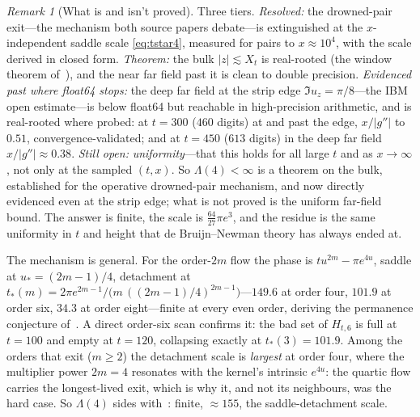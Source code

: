 \documentclass[11pt,reqno]{amsart}
\theoremstyle{plain}
\theoremstyle{definition}
\theoremstyle{remark}
\newtheorem{remark}[theorem]{Remark}
\begin{document}
\begin{remark}[What is and isn't proved]\label{rem:gpu-proof}
Three tiers. \emph{Resolved:} the drowned-pair exit---the mechanism both
source papers debate---is extinguished at the $x$-independent saddle scale
\eqref{eq:tstar4}, measured for pairs to $x\approx10^4$, with the scale
derived in closed form. \emph{Theorem:} the bulk $|z|\lesssim X_t$ is
real-rooted (the window theorem of~\cite{FontesIBM}), and the near far
field past it is clean to double precision. \emph{Evidenced past where float64 stops:} the deep far field at the strip
edge $\Im u_z=\pi/8$---the IBM open estimate---is below float64 but
reachable in high-precision arithmetic, and is real-rooted where probed: at
$t=300$ ($460$ digits) at and past the edge, $x/|g''|$ to $0.51$,
convergence-validated; and at $t=450$ ($613$ digits) in the deep far field
$x/|g''|\approx0.38$. \emph{Still open:} \emph{uniformity}---that this holds
for all large $t$ and as $x\to\infty$, not only at the sampled $(t,x)$. So $\Lambda(4)<\infty$ is a
theorem on the bulk, established for the operative drowned-pair mechanism,
and now directly evidenced even at the strip edge; what is not proved is
the uniform far-field bound. The answer is finite, the scale is
$\tfrac{64}{27}\pi e^3$, and the residue is the same uniformity in
$t$ and height that de Bruijn--Newman theory has always ended at.
\end{remark}

The mechanism is general. For the order-$2m$ flow the phase is
$tu^{2m}-\pi e^{4u}$, saddle at $u_*=(2m-1)/4$, detachment at
$t_*(m)=2\pi e^{2m-1}/\bigl(m\,((2m-1)/4)^{2m-1}\bigr)$---$149.6$ at order
four, $101.9$ at order six, $34.3$ at order eight---finite at every even
order, deriving the permanence conjecture of~\cite{FontesIBM}. A direct
order-six scan confirms it: the bad set of $H_{t,6}$ is full at $t=100$ and
empty at $t=120$, collapsing exactly at $t_*(3)=101.9$. Among the orders
that exit ($m\ge2$) the detachment scale is \emph{largest} at order four,
where the multiplier power $2m=4$ resonates with the kernel's intrinsic
$e^{4u}$: the quartic flow carries the longest-lived exit, which is why it,
and not its neighbours, was the hard case. So $\Lambda(4)$ sides
with~\cite{FontesIBM}: finite, $\approx155$, the saddle-detachment scale.
\end{document}

